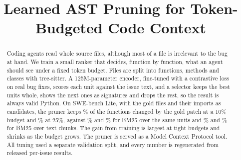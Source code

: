 \documentclass[conference]{IEEEtran}
\begin{document}
\title{Learned AST Pruning for Token-Budgeted Code Context}

\author{
\and
{}
}

\maketitle

\begin{abstract}
Coding agents read whole source files, although most of a file is irrelevant to the bug at hand. We train a small ranker that decides, function by function, what an agent should see under a fixed token budget. Files are split into functions, methods and classes with tree-sitter. A 125M-parameter encoder, fine-tuned with a contrastive loss on  real bug fixes, scores each unit against the issue text, and a selector keeps the best units whole, shows the next ones as signatures and drops the rest, so the result is always valid Python. On SWE-bench Lite, with the gold files and their imports as candidates, the pruner keeps \% of the functions changed by the gold patch at a 10\% budget and \% at 25\%, against \% and \% for BM25 over the same units and \% and \% for BM25 over text chunks. The gain from training is largest at tight budgets and shrinks as the budget grows. The pruner is served as a Model Context Protocol tool. All tuning used a separate validation split, and every number is regenerated from released per-issue results.
\end{abstract}







\end{document}
